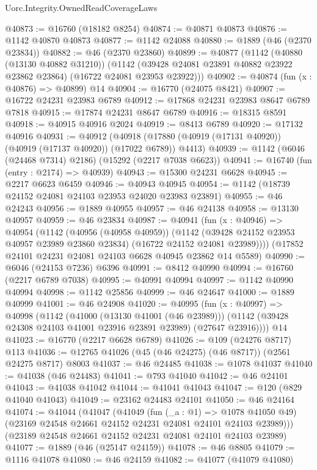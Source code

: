 \begin{lexlean}{Uorc.Integrity.OwnedReadCoverageLaws}
\begin{coremodule}
@40873 := @16760 (@18182 @8254)
@40874 := @40871 @40873
@40876 := @1142 @40870 @40873
@40877 := @1142 @24088
@40880 := @1889 (@46 (@2370 @23834))
@40882 := @46 (@2370 @23860)
@40899 := @40877
    (@1142
      (@40880 (@13130 @40882 @31210))
      (@1142 (@39428 @24081 @23891 @40882 @23922 @23862 @23864) (@16722 @24081 @23953 @23922)))
@40902 := @40874 (fun (x : @40876) => @40899) @14
@40904 := @16770 (@24075 @8421)
@40907 := @16722 @24231 @23983 @6789
@40912 := @17868 @24231 @23983 @8647 @6789 @7818
@40915 := @17874 @24231 @8647 @6789
@40916 := @18315 @8591
@40918 := @40915 @40916 @2024
@40919 := @8413 @6789
@40920 := @17132 @40916
@40931 := @40912
    (@40918 (@17880 (@40919 (@17131 @40920)) (@40919 (@17137 @40920)) (@17022 @6789)) @4413)
@40939 := @1142 (@6046 (@24468 @7314) @2186) (@15292 (@2217 @7038 @6623))
@40941 := @16740 (fun (entry : @2174) => @40939)
@40943 := @15300 @24231 @6628
@40945 := @2217 @6623 @6459
@40946 := @40943 @40945
@40954 := @1142 (@18739 @24152 @24081 @24103 @23953 @24020 @23983 @23891)
@40955 := @46 @24243
@40956 := @1889 @40955
@40957 := @46 @24138
@40958 := @13130 @40957
@40959 := @46 @23834
@40987 := @40941
    (fun (x : @40946) =>
    @40954
      (@1142
        (@40956 (@40958 @40959))
        (@1142 (@39428 @24152 @23953 @40957 @23989 @23860 @23834) (@16722 @24152 @24081 @23989))))
    (@17852 @24101 @24231 @24081 @24103 @6628 @40945 @23862 @14 @5589)
@40990 := @6046 (@24153 @7236) @6396
@40991 := @8412 @40990
@40994 := @16760 (@2217 @6789 @7038)
@40995 := @40991 @40994
@40997 := @1142 @40990 @40994
@40998 := @1142 @25856
@40999 := @46 @24647
@41000 := @1889 @40999
@41001 := @46 @24908
@41020 := @40995
    (fun (x : @40997) =>
    @40998
      (@1142
        (@41000 (@13130 @41001 (@46 @23989)))
        (@1142 (@39428 @24308 @24103 @41001 @23916 @23891 @23989) (@27647 @23916))))
    @14
@41023 := @16770 (@2217 @6628 @6789)
@41026 := @109 (@24276 @8717) @113
@41036 := @12765 @41026 (@45 (@46 @24275) (@46 @8717)) (@2561 @24275 @8717) @8003
@41037 := @46 @24485
@41038 := @1078 @41037
@41040 := @41038 (@46 @24483)
@41041 := @793 @41040
@41042 := @46 @24101
@41043 := @41038 @41042
@41044 := @41041 @41043
@41047 := @120 (@829 @41040 @41043)
@41049 := @23162 @24483 @24101
@41050 := @46 @24164
@41074 := @41044
    (@41047
      (@41049
        (fun (_a : @1) => @1078 @41050 @49)
        (@23169 @24548 @24661 @24152 @24231 @24081 @24101 @24103 @23989)))
    (@23189 @24548 @24661 @24152 @24231 @24081 @24101 @24103 @23989)
@41077 := @1889 (@46 (@25147 @24159))
@41078 := @46 @8805
@41079 := @1116 @41078
@41080 := @46 @24159
@41082 := @41077 (@41079 @41080)

\end{coremodule}
\end{lexlean}
